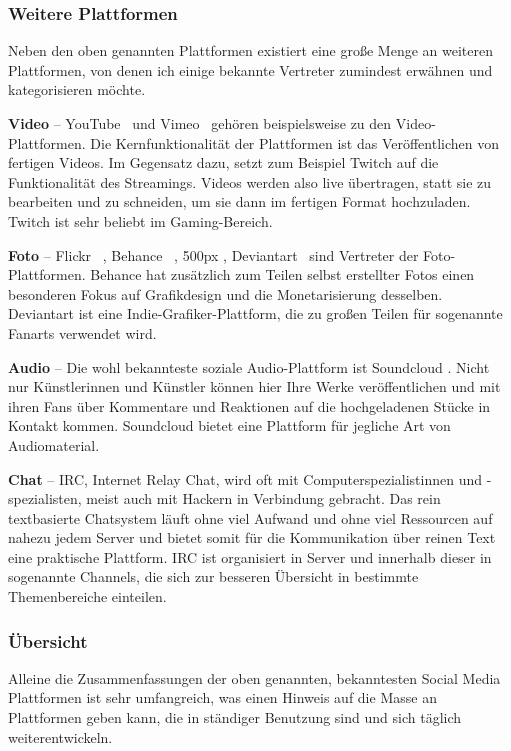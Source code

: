 \subsubsection{Weitere Plattformen}

Neben den oben genannten Plattformen existiert eine große Menge an weiteren Plattformen, von denen ich einige bekannte Vertreter zumindest erwähnen und kategorisieren möchte.

\textbf{Video} -- YouTube \faYoutube\ und Vimeo \faVimeo\ gehören beispielsweise zu den Video-Plattformen. Die Kernfunktionalität der Plattformen ist das Veröffentlichen von fertigen Videos. Im Gegensatz dazu, setzt zum Beispiel Twitch auf die Funktionalität des Streamings. Videos werden also live übertragen, statt sie zu bearbeiten und zu schneiden, um sie dann im fertigen Format hochzuladen. Twitch ist sehr beliebt im Gaming-Bereich.

\textbf{Foto} -- Flickr \faFlickr\ , Behance \faBehance\ , 500px \faicon{500px}, Deviantart \faDeviantart\ sind Vertreter der Foto-Plattformen. Behance hat zusätzlich zum Teilen selbst erstellter Fotos einen besonderen Fokus auf Grafikdesign und die Monetarisierung desselben. Deviantart ist eine Indie-Grafiker-Plattform, die zu großen Teilen für sogenannte Fanarts verwendet wird.

\textbf{Audio} -- Die wohl bekannteste soziale Audio-Plattform ist Soundcloud \faSoundcloud. Nicht nur Künstlerinnen und Künstler können hier Ihre Werke veröffentlichen und mit ihren Fans über Kommentare und Reaktionen auf die hochgeladenen Stücke in Kontakt kommen. Soundcloud bietet eine Plattform für jegliche Art von Audiomaterial.

\textbf{Chat} -- IRC, Internet Relay Chat, wird oft mit Computerspezialistinnen und -spezialisten, meist auch mit Hackern in Verbindung gebracht. Das rein textbasierte Chatsystem läuft ohne viel Aufwand und ohne viel Ressourcen auf nahezu jedem Server und bietet somit für die Kommunikation über reinen Text eine praktische Plattform. IRC ist organisiert in Server und innerhalb dieser in sogenannte Channels, die sich zur besseren Übersicht in bestimmte Themenbereiche einteilen.

\subsubsection{Übersicht}

Alleine die Zusammenfassungen der oben genannten, bekanntesten Social Media Plattformen ist sehr umfangreich, was einen Hinweis auf die Masse an Plattformen geben kann, die in ständiger Benutzung sind und sich täglich weiterentwickeln.

